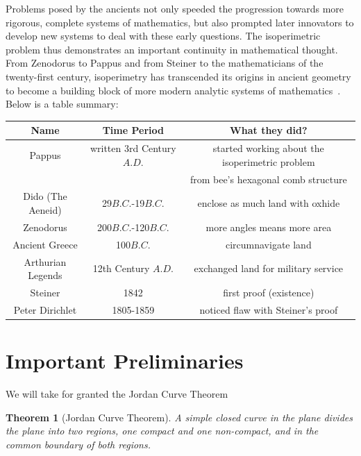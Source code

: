 \documentclass[a4paper]{book}
\newtheorem{theorem}{Theorem}%
\begin{document}
Problems posed by the ancients not only speeded the progression towards more rigorous, complete systems of mathematics, but also prompted later innovators to develop new systems to deal with these early questions. The isoperimetric problem thus demonstrates an important continuity in mathematical thought. From Zenodorus to Pappus and from Steiner to the mathematicians of the twenty-first century, isoperimetry has transcended its origins in ancient geometry to become a building block of more modern analytic systems of mathematics~\cite{wiegert2010sagacity}. Below is a table summary:
\begin{center}
    \begin{tabular}{||c c c||} 
        \hline
        Name & Time Period & What they did? \\ [0.5ex] 
        \hline
        Pappus & written 3rd Century $A.D.$ & started working about the isoperimetric problem \\ && from bee's hexagonal comb structure  \\ 
        \hline
        Dido (The Aeneid) & 29$B.C.$-19$B.C.$ & enclose as much land with oxhide \\
        \hline
        Zenodorus & 200$B.C.$-120$B.C.$ & more angles means more area \\
        \hline
        Ancient Greece & 100$B.C.$ & circumnavigate land \\
        \hline
        Arthurian Legends & 12th Century $A.D.$ & exchanged land for military service \\
        \hline
        Steiner & 1842 & first proof (existence) \\ 
        \hline
        Peter Dirichlet & 1805-1859 & noticed flaw with Steiner's proof \\ [1ex]
        \hline
    \end{tabular}
\end{center}

\section{Important Preliminaries}
We will take for granted the Jordan Curve Theorem
\begin{theorem}[Jordan Curve Theorem]
    A simple closed curve in the plane divides the plane into two regions, one compact and one non-compact, and in the common boundary of both regions.
\end{theorem}
\end{document}
